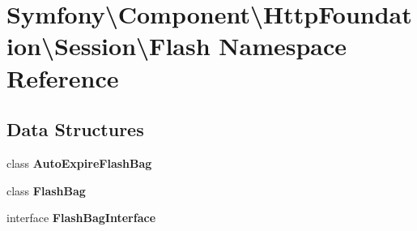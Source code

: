 \section{Symfony\textbackslash{}Component\textbackslash{}Http\+Foundation\textbackslash{}Session\textbackslash{}Flash Namespace Reference}
\label{namespace_symfony_1_1_component_1_1_http_foundation_1_1_session_1_1_flash}
\subsection*{Data Structures}
\begin{DoxyCompactItemize}
\item 
class {\bf Auto\+Expire\+Flash\+Bag}
\item 
class {\bf Flash\+Bag}
\item 
interface {\bf Flash\+Bag\+Interface}
\end{DoxyCompactItemize}

